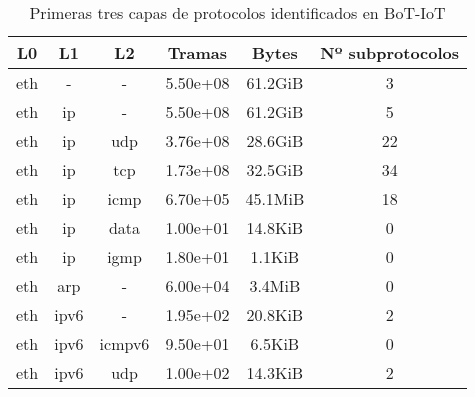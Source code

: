 \begin{table}[H]
    \begin{center}
        \begin{tabular}{|c c c | c c c|} 
            \hline
            \textbf{L0} & \textbf{L1} & \textbf{L2} & \textbf{Tramas} & \textbf{Bytes} & \textbf{Nº subprotocolos}\\
            \hline\hline
eth &- &- & 5.50e+08 & 61.2GiB & 3 \\
eth &ip &- & 5.50e+08 & 61.2GiB & 5 \\
eth &ip &udp & 3.76e+08 & 28.6GiB & 22 \\
eth &ip &tcp & 1.73e+08 & 32.5GiB & 34 \\
eth &ip &icmp & 6.70e+05 & 45.1MiB & 18 \\
eth &ip &data & 1.00e+01 & 14.8KiB & 0 \\
eth &ip &igmp & 1.80e+01 & 1.1KiB & 0 \\
eth &arp &- & 6.00e+04 & 3.4MiB & 0 \\
eth &ipv6 &- & 1.95e+02 & 20.8KiB & 2 \\
eth &ipv6 &icmpv6 & 9.50e+01 & 6.5KiB & 0 \\
eth &ipv6 &udp & 1.00e+02 & 14.3KiB & 2 \\
            \hline
        \end{tabular}
    \end{center}
    \caption{Primeras tres capas de protocolos identificados en BoT-IoT}
    \label{table:botiotprotocols}
\end{table}
